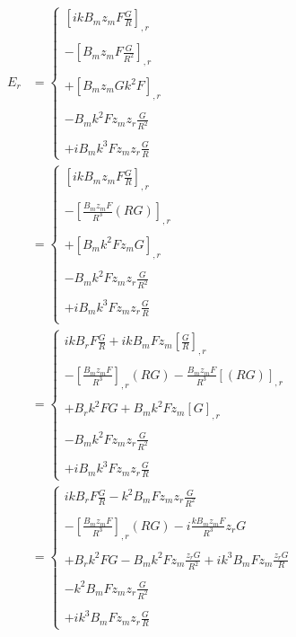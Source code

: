 \begin{align}
E_r&= \left\{\begin{array}{l}\left[ikB_mz_mF\frac{G}{R}\right]_{,r}\\\\
-\left[B_mz_mF\frac{G}{R^2}\right]_{,r}\\\\
+\left[B_mz_mGk^2F\right]_{,r}\\\\
-B_mk^2Fz_mz_r\frac{G}{R^2}\\\\
+iB_mk^3Fz_mz_r\frac{G}{R}
\end{array}\right.\\
&= \left\{\begin{array}{l}
\left[ikB_mz_mF\frac{G}{R}\right]_{,r}\\\\
-\left[\frac{B_mz_mF}{R^3}(RG)\right]_{,r}\\\\
+\left[B_mk^2Fz_mG\right]_{,r}\\\\
-B_mk^2Fz_mz_r\frac{G}{R^2}\\\\
+iB_mk^3Fz_mz_r\frac{G}{R}\\
\end{array}\right.\\
&= \left\{\begin{array}{l}
ikB_rF\frac{G}{R}+ikB_mFz_m\left[\frac{G}{R}\right]_{,r}\\\\
-\left[\frac{B_mz_mF}{R^3}\right]_{,r}(RG)-\frac{B_mz_mF}{R^3}\left[(RG)\right]_{,r}\\\\
+B_rk^2FG+B_mk^2Fz_m\left[G\right]_{,r}\\\\
-B_mk^2Fz_mz_r\frac{G}{R^2}\\\\
+iB_mk^3Fz_mz_r\frac{G}{R}
\end{array}\right.\\
&= \left\{\begin{array}{l}
ikB_rF\frac{G}{R}-k^2B_mFz_mz_r\frac{G}{R^2}\\\\
-\left[\frac{B_mz_mF}{R^3}\right]_{,r}(RG)-i\frac{kB_mz_mF}{R^3}z_rG\\\\
+B_rk^2FG-B_mk^2Fz_m\frac{z_rG}{R^2}+ik^3B_mFz_m\frac{z_rG}{R}\\\\
-k^2B_mFz_mz_r\frac{G}{R^2}\\\\
+ik^3B_mFz_mz_r\frac{G}{R}
\end{array}\right.\\
\end{align}


















